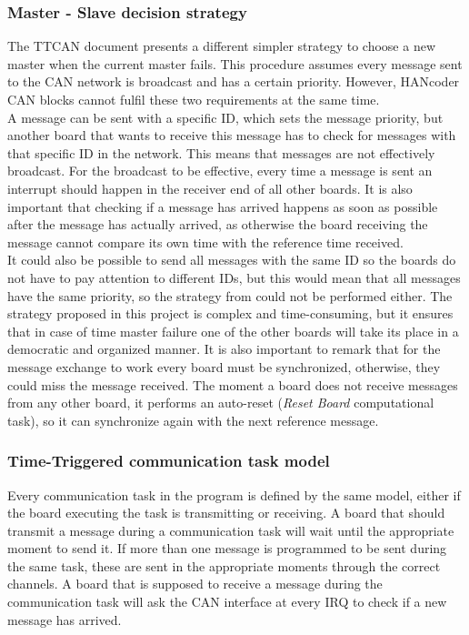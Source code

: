 \documentclass[table,xcdraw]{article}
\begin{document}
\subsubsection{Master - Slave decision strategy}\label{sec:method_master_slave_strategy}

The TTCAN document \citep{ttcan} presents a different simpler strategy to choose a new master when the current master fails. This procedure assumes every message sent to the CAN network is broadcast and has a certain priority. However, HANcoder CAN blocks cannot fulfil these two requirements at the same time.\\

A message can be sent with a specific ID, which sets the message priority, but another board that wants to receive this message has to check for messages with that specific ID in the network. This means that messages are not effectively broadcast. For the broadcast to be effective, every time a message is sent an interrupt should happen in the receiver end of all other boards. It is also important that checking if a message has arrived happens as soon as possible after the message has actually arrived, as otherwise the board receiving the message cannot compare its own time with the reference time received.\\

It could also be possible to send all messages with the same ID so the boards do not have to pay attention to different IDs, but this would mean that all messages have the same priority, so the strategy from \citep{ttcan} could not be performed either. The strategy proposed in this project is complex and time-consuming, but it ensures that in case of time master failure one of the other boards will take its place in a democratic and organized manner. It is also important to remark that for the message exchange to work every board must be synchronized, otherwise, they could miss the message received. The moment a board does not receive messages from any other board, it performs an auto-reset (\textit{Reset Board} computational task), so it can synchronize again with the next reference message.


\subsubsection{Time-Triggered communication task model}\label{sec:tt_comm_model}
Every communication task in the program is defined by the same model, either if the board executing the task is transmitting or receiving. A board that should transmit a message during a communication task will wait until the appropriate moment to send it. If more than one message is programmed to be sent during the same task, these are sent in the appropriate moments through the correct channels. A board that is supposed to receive a message during the communication task will ask the CAN interface at every IRQ to check if a new message has arrived.\\
\end{document}
